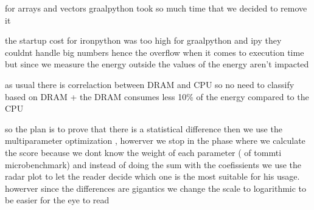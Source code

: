 for arrays and vectors  graalpython took so much time that we decided to remove it

the startup cost for ironpython was too high
for graalpython and ipy they couldnt handle big numbers hence the overflow  when it comes to execution time
but since we measure the energy outside the values of the energy aren't impacted

as usual there is  correlaction between DRAM and CPU so no need to classify based on DRAM + the DRAM consumes less 10\% of the  energy compared to the CPU

so the plan is to prove that there is a statistical difference
then we use the multiparameter optimization , howerver we stop in the phase where we calculate the score
because we dont know the weight of each parameter ( of tommti microbenchmark) and instead of doing the sum with the coefissients we use the radar plot to let the reader decide which one is the most suitable for his usage. howerver since the differences are gigantics we change the scale to logarithmic to be easier for the eye to read





